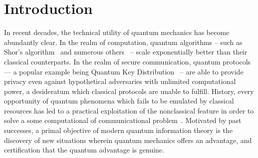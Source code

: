 \documentclass[aps, 10pt, english, twoside, pra, nofootinbib, tightenlines, longbibliography]{revtex4-1}
\begin{document}
    \section{Introduction}
    \label{sec:introduction}
    In recent decades, the technical utility of quantum mechanics has become abundantly clear. In the realm of computation, quantum algorithms -- such as Shor's algorithm~\cite{Shor_1997} and numerous others~\cite{Jordan_2016} -- scale exponentially better than their classical counterparts. In the realm of secure communication, quantum protocols --- a popular example being Quantum Key Distribution~\cite{Bennett_2014} -- are able to provide privacy even against hypothetical adversaries with unlimited computational power, a desideratum which classical protocols are unable to fulfill. History, every opportunity of quantum phenomena which fails to be emulated by classical resources has led to a practical exploitation of the nonclassical feature in order to solve a some computational of communicational problem~\cite{Neilsen_Chaung_2011}. Motivated by past successes, a primal objective of modern quantum information theory is the discovery of new situations wherein quantum mechanics offers an advantage, and certification that the quantum advantage is genuine.
\end{document}
